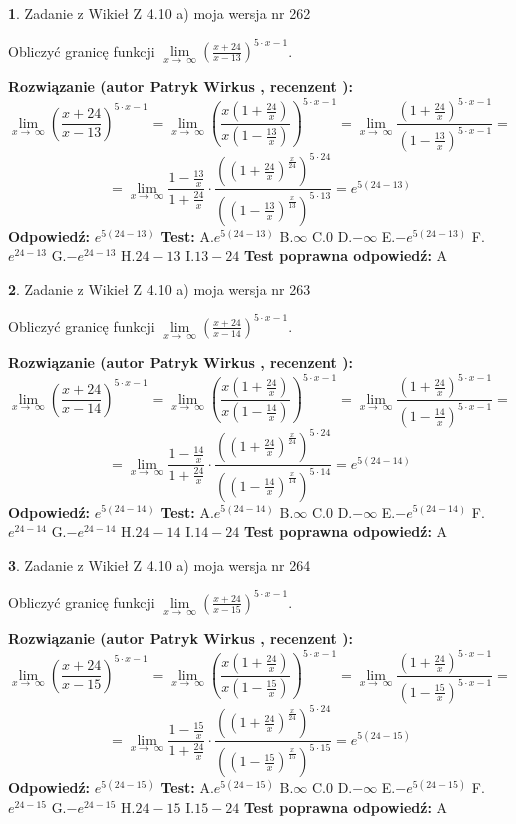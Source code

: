 \documentclass[12pt, a4paper]{article}
\theoremstyle{definition} %
\newtheorem{zad}{}
\newcommand{\zadStart}[1]{\begin{zad}#1\newline}
\newcommand{\zadStop}{\end{zad}}
\newcommand{\rozwStart}[2]{\noindent \textbf{Rozwiązanie (autor #1 , recenzent #2): }\newline}
\newcommand{\rozwStop}{\newline}
\newcommand{\odpStart}{\noindent \textbf{Odpowiedź:}\newline}
\newcommand{\odpStop}{\newline}
\newcommand{\testStart}{\noindent \textbf{Test:}\newline}
\newcommand{\testStop}{\newline}
\newcommand{\kluczStart}{\noindent \textbf{Test poprawna odpowiedź:}\newline}
\newcommand{\kluczStop}{\newline}
\begin{document}
\zadStart{Zadanie z Wikieł Z 4.10 a) moja wersja nr 262}


Obliczyć granicę funkcji  $\lim\limits_{x\to\ \infty}(\frac{x+24}{x-13})^{5\cdot x-1}$.
\zadStop
\rozwStart{Patryk Wirkus}{}
$$\lim\limits_{x\to\ \infty}(\frac{x+24}{x-13})^{5\cdot x-1} = \lim\limits_{x\to\ \infty}(\frac{x(1+\frac{24}{x})}{x(1-\frac{13}{x})})^{5\cdot x-1}=\lim\limits_{x\to\ \infty}\frac{(1+\frac{24}{x})^{5\cdot x-1}}{(1-\frac{13}{x})^{5\cdot x-1}}=$$
$$=\lim\limits_{x\to\ \infty}\frac{1-\frac{13}{x}}{1+\frac{24}{x}}\cdot\frac{((1+\frac{24}{x})^{\frac{x}{24}})^{5\cdot24}}{((1-\frac{13}{x})^{\frac{x}{13}})^{5\cdot13}}=e^{5(24-13)}$$
\rozwStop
\odpStart
$e^{5(24-13)}$
\odpStop
\testStart
A.$e^{5(24-13)}$ B.$\infty$ C.$0$ D.$-\infty$ E.$-e^{5(24-13)}$
F.$e^{24-13}$ G.$-e^{24-13}$
H.$24-13$
I.$13-24$
\testStop
\kluczStart
A
\kluczStop



\zadStart{Zadanie z Wikieł Z 4.10 a) moja wersja nr 263}


Obliczyć granicę funkcji  $\lim\limits_{x\to\ \infty}(\frac{x+24}{x-14})^{5\cdot x-1}$.
\zadStop
\rozwStart{Patryk Wirkus}{}
$$\lim\limits_{x\to\ \infty}(\frac{x+24}{x-14})^{5\cdot x-1} = \lim\limits_{x\to\ \infty}(\frac{x(1+\frac{24}{x})}{x(1-\frac{14}{x})})^{5\cdot x-1}=\lim\limits_{x\to\ \infty}\frac{(1+\frac{24}{x})^{5\cdot x-1}}{(1-\frac{14}{x})^{5\cdot x-1}}=$$
$$=\lim\limits_{x\to\ \infty}\frac{1-\frac{14}{x}}{1+\frac{24}{x}}\cdot\frac{((1+\frac{24}{x})^{\frac{x}{24}})^{5\cdot24}}{((1-\frac{14}{x})^{\frac{x}{14}})^{5\cdot14}}=e^{5(24-14)}$$
\rozwStop
\odpStart
$e^{5(24-14)}$
\odpStop
\testStart
A.$e^{5(24-14)}$ B.$\infty$ C.$0$ D.$-\infty$ E.$-e^{5(24-14)}$
F.$e^{24-14}$ G.$-e^{24-14}$
H.$24-14$
I.$14-24$
\testStop
\kluczStart
A
\kluczStop



\zadStart{Zadanie z Wikieł Z 4.10 a) moja wersja nr 264}


Obliczyć granicę funkcji  $\lim\limits_{x\to\ \infty}(\frac{x+24}{x-15})^{5\cdot x-1}$.
\zadStop
\rozwStart{Patryk Wirkus}{}
$$\lim\limits_{x\to\ \infty}(\frac{x+24}{x-15})^{5\cdot x-1} = \lim\limits_{x\to\ \infty}(\frac{x(1+\frac{24}{x})}{x(1-\frac{15}{x})})^{5\cdot x-1}=\lim\limits_{x\to\ \infty}\frac{(1+\frac{24}{x})^{5\cdot x-1}}{(1-\frac{15}{x})^{5\cdot x-1}}=$$
$$=\lim\limits_{x\to\ \infty}\frac{1-\frac{15}{x}}{1+\frac{24}{x}}\cdot\frac{((1+\frac{24}{x})^{\frac{x}{24}})^{5\cdot24}}{((1-\frac{15}{x})^{\frac{x}{15}})^{5\cdot15}}=e^{5(24-15)}$$
\rozwStop
\odpStart
$e^{5(24-15)}$
\odpStop
\testStart
A.$e^{5(24-15)}$ B.$\infty$ C.$0$ D.$-\infty$ E.$-e^{5(24-15)}$
F.$e^{24-15}$ G.$-e^{24-15}$
H.$24-15$
I.$15-24$
\testStop
\kluczStart
A
\kluczStop
\end{document}
